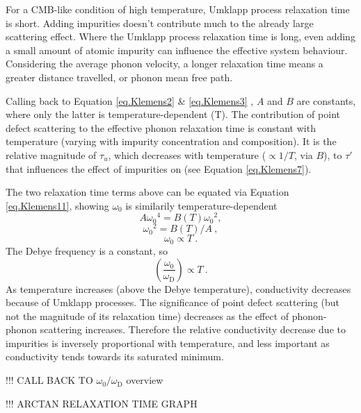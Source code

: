 For a CMB-like condition of high temperature, Umklapp process relaxation time is short. Adding impurities doesn't contribute much to the already large scattering effect. Where the Umklapp process relaxation time is long, even adding a small amount of atomic impurity can influence the effective system behaviour. Considering the average phonon velocity, a longer relaxation time means a greater distance travelled, or phonon mean free path.

Calling back to Equation \ref{eq.Klemens2} \& \ref{eq.Klemens3} , $A$ and $B$ are constants, where only the latter is temperature-dependent (T). The contribution of point defect scattering to the effective phonon relaxation time is constant with temperature (varying with impurity concentration and composition). It is the relative magnitude of $\tau_{u}$, which decreases with temperature ($\propto 1/T$, via $B$), to ${\tau}'$ that influences the effect of impurities on \tcs (see Equation \ref{eq.Klemens7}).
 
The two relaxation time terms above can be equated via Equation \ref{eq.Klemens11}, showing $\omega_{0}$ is similarily temperature-dependent
%
$$A{\omega_{0}}^{4}=B\left(T\right){\omega_{0}}^{2},$$
$${\omega_{0}}^{2}=B\left(T\right)/A\ ,$$
%
\begin{equation}
\omega_{0} \propto T\ .
\label{eq.Klemens23mod}
\end{equation}
%
The Debye frequency is a constant, so
%
\begin{equation}
\left (\frac{\omega_{\mathrm{0}}}{\omega_{\mathrm{D}}} \right ) \propto T\ .
\label{eq.Klemens23mod2}
\end{equation}
%
As temperature increases (above the Debye temperature), conductivity decreases because of Umklapp processes. The significance of point defect scattering (but not the magnitude of its relaxation time) decreases as the effect of phonon-phonon scattering increases. Therefore the relative conductivity decrease due to impurities is inversely proportional with temperature, and less important as conductivity tends towards its saturated minimum.

!!! CALL BACK TO $\omega_{\mathrm{0}}/\omega_{\mathrm{D}}$ overview

!!! ARCTAN RELAXATION TIME GRAPH







\pagebreak


